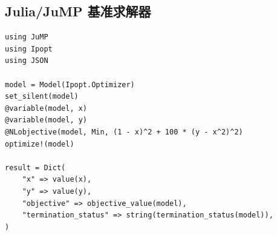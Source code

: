 \documentclass[UTF8,a4paper,12pt,fontset=none]{ctexart}
\begin{document}
\subsection{Julia/JuMP 基准求解器}

\begin{lstlisting}
using JuMP
using Ipopt
using JSON

model = Model(Ipopt.Optimizer)
set_silent(model)
@variable(model, x)
@variable(model, y)
@NLobjective(model, Min, (1 - x)^2 + 100 * (y - x^2)^2)
optimize!(model)

result = Dict(
    "x" => value(x),
    "y" => value(y),
    "objective" => objective_value(model),
    "termination_status" => string(termination_status(model)),
)
\end{lstlisting}
\end{document}
